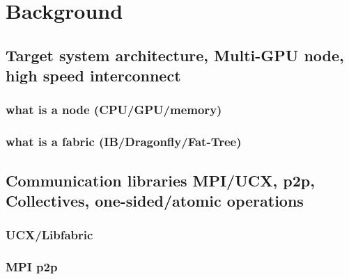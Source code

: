 
\glsresetall %
\chapter[Background]{Background}\label{ch:Background}


    \section{Target system architecture, Multi-GPU node, high speed interconnect}
        \subsection{what is a node (CPU/GPU/memory)}
        \subsection{what is a fabric (IB/Dragonfly/Fat-Tree)}
    \section{Communication libraries MPI/UCX, p2p, Collectives, one-sided/atomic operations \cite{mpi40, gabriel2004OpenMPI, MPICH, shamis2015ucx}}
        \subsection{UCX/Libfabric}
        \subsection{MPI p2p}
